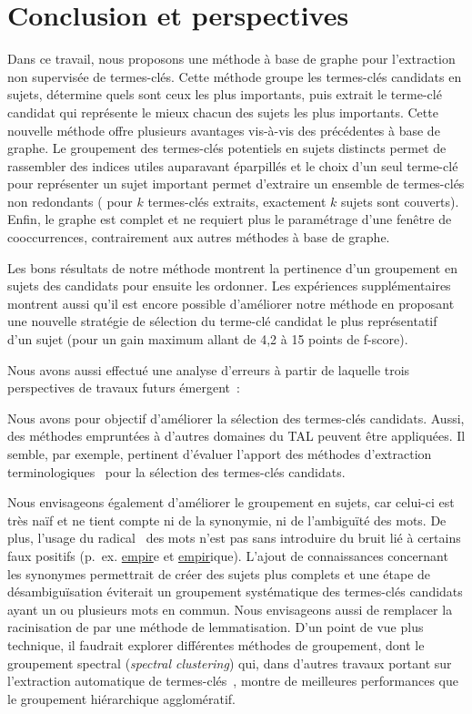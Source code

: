 \section{Conclusion et perspectives}
\label{sec:conclusion_et_perspectives}
  Dans ce travail, nous proposons une méthode à base de graphe pour l'extraction
  non supervisée de termes-clés. Cette méthode groupe les termes-clés candidats
  en sujets, détermine quels sont ceux les plus importants, puis extrait le
  terme-clé candidat qui représente le mieux chacun des sujets les plus
  importants. Cette nouvelle méthode offre plusieurs avantages vis-à-vis des
  précédentes à base de graphe. Le groupement des termes-clés potentiels en
  sujets distincts permet de rassembler des indices utiles auparavant éparpillés
  et le choix d'un seul terme-clé pour représenter un sujet important permet
  d'extraire un ensemble de termes-clés non redondants ( pour $k$ termes-clés
  extraits, exactement $k$ sujets sont couverts). Enfin, le graphe est complet
  et ne requiert plus le paramétrage d'une fenêtre de cooccurrences,
  contrairement aux autres méthodes à base de graphe.

  Les bons résultats de notre méthode montrent la pertinence d'un groupement en
  sujets des candidats pour ensuite les ordonner. Les expériences
  supplémentaires montrent aussi qu'il est encore possible d'améliorer notre
  méthode en proposant une nouvelle stratégie de sélection du terme-clé candidat
  le plus représentatif d'un sujet (pour un gain maximum allant de 4,2 à 15
  points de f-score).

  Nous avons aussi effectué une analyse d'erreurs à partir de laquelle trois
  perspectives de travaux futurs émergent~:

  Nous avons pour objectif d'améliorer la sélection des termes-clés candidats.
  Aussi, des méthodes empruntées à d'autres domaines du TAL peuvent être
  appliquées. Il semble, par exemple, pertinent d'évaluer l'apport des méthodes
  d'extraction terminologiques~\cite{castellvi2001automatictermdetection} pour
  la sélection des termes-clés candidats.
  
  Nous envisageons également d'améliorer le groupement en sujets,
  car celui-ci est très naïf et ne tient compte ni de la synonymie, ni de
  l'ambiguïté des mots. De plus, l'usage du
  radical~\cite{porter1980suffixstripping} des mots n'est pas sans introduire du
  bruit lié à certains faux positifs (p.~ex. \og{}\underline{empir}e\fg{} et
  \og{}\underline{empir}ique\fg{}). L'ajout de connaissances concernant les
  synonymes permettrait de créer des sujets plus complets et une étape de
  désambiguïsation éviterait un groupement systématique des termes-clés
  candidats ayant un ou plusieurs mots en commun. Nous envisageons aussi de
  remplacer la racinisation de  par une
  méthode de lemmatisation. D'un point de vue plus technique, il faudrait
  explorer différentes méthodes de groupement, dont le groupement spectral
  (\textit{spectral clustering}) qui, dans d'autres travaux portant sur
  l'extraction automatique de termes-clés~\cite{liu2009keycluster}, montre de
  meilleures performances que le groupement hiérarchique agglomératif.

